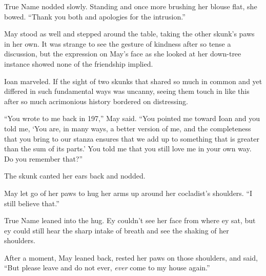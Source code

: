 True Name nodded slowly. Standing and once more brushing her blouse flat, she bowed. ``Thank you both and apologies for the intrusion.''

May stood as well and stepped around the table, taking the other skunk's paws in her own. It was strange to see the gesture of kindness after so tense a discussion, but the expression on May's face as she looked at her down-tree instance showed none of the friendship implied.

Ioan marveled. If the sight of two skunks that shared so much in common and yet differed in such fundamental ways was uncanny, seeing them touch in like this after so much acrimonious history bordered on distressing.

``You wrote to me back in 197,'' May said. ``You pointed me toward Ioan and you told me, `You are, in many ways, a better version of me, and the completeness that you bring to our stanza ensures that we add up to something that is greater than the sum of its parts.' You told me that you still love me in your own way. Do you remember that?''

The skunk canted her ears back and nodded.

May let go of her paws to hug her arms up around her cocladist's shoulders. ``I still believe that.''

True Name leaned into the hug. Ey couldn't see her face from where ey sat, but ey could still hear the sharp intake of breath and see the shaking of her shoulders.

After a moment, May leaned back, rested her paws on those shoulders, and said, ``But please leave and do not ever, \emph{ever} come to my house again.''
